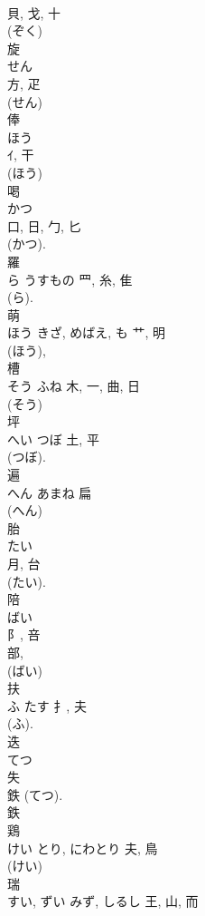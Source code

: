 \documentclass[8pt]{extreport}
\begin{document}
\begin{CJK}{UTF8}{min}
\\	貝, 戈, 十	
\\	(ぞく) 
\\	旋	
\\	せん	
\\	方, 疋		
\\	(せん) 
\\	俸	
\\	ほう	
\\	ｲ, 干		
\\	(ほう) 
\\	喝	
\\	かつ	
\\	口, 日, 勹, 匕	
\\	(かつ).	
\\	羅	
\\	ら	うすもの	罒, 糸, 隹	
\\	(ら).	
\\	萌	
\\	ほう	きざ, めばえ, も	艹, 明	
\\	(ほう), 
\\	槽	
\\	そう	ふね	木, 一, 曲, 日	
\\	(そう) 
\\	坪	
\\	へい	つぼ	土, 平	
\\	(つぼ). 
\\	遍	
\\	へん	あまね	扁		
\\	(へん) 
\\	胎	
\\	たい	
\\	月, 台	
\\	(たい). 
\\	陪	
\\	ばい	
\\	阝, 咅	
\\	部, 
\\	(ばい) 
\\	扶	
\\	ふ	たす	扌, 夫	
\\	(ふ). 
\\	迭	
\\	てつ	
\\	失		
\\	鉄 (てつ). 
\\	鉄 
\\	鶏	
\\	けい	とり, にわとり	夫, 鳥		
\\	(けい) 
\\	瑞	
\\	すい, ずい	みず, しるし	王, 山, 而	

\end{CJK}
\end{document}
